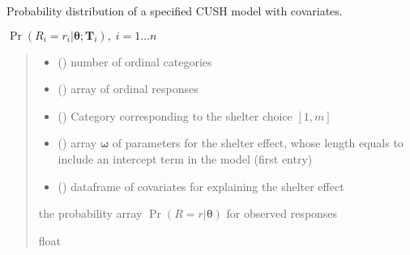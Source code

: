 \documentclass[letterpaper,10pt,english]{sphinxmanual}
\begin{document}

\begin{fulllineitems}
\label{\detokenize{cubmods:cubmods.cush_x.prob}}
\pysigstartsignatures
{}
\pysigstopsignatures
\sphinxAtStartPar
Probability distribution of a specified CUSH model with covariates.

\sphinxAtStartPar
\(\Pr(R_i=r_i|\pmb\theta;\pmb T_i),\;i = 1 \ldots n\)
\begin{quote}\begin{description}
\begin{itemize}
\item {} 
\sphinxAtStartPar
{} () \textendash{} number of ordinal categories

\item {} 
\sphinxAtStartPar
{} () \textendash{} array of ordinal responses

\item {} 
\sphinxAtStartPar
{} () \textendash{} Category corresponding to the shelter choice \([1,m]\)

\item {} 
\sphinxAtStartPar
{} () \textendash{} array \(\pmb \omega\) of parameters for the shelter effect, whose length equals 
 to include an intercept term in the model (first entry)

\item {} 
\sphinxAtStartPar
{} () \textendash{} dataframe of covariates for explaining the shelter effect

\end{itemize}

\sphinxAtStartPar
the probability array \(\Pr(R = r | \pmb\theta)\) for observed responses

\sphinxAtStartPar
float

\end{description}\end{quote}

\end{fulllineitems}
\end{document}
